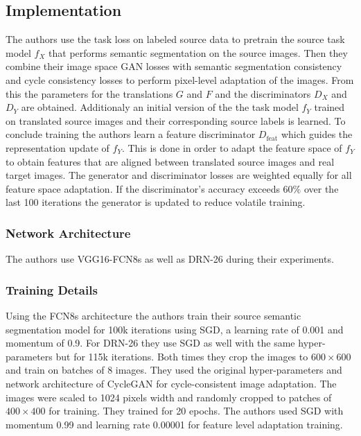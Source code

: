 \subsection{Implementation}
The authors use the task loss on labeled source data to pretrain the source task model $f_X$ that performs semantic segmentation on the source images. Then they combine their image space GAN losses with semantic segmentation consistency and cycle consistency losses to perform pixel-level adaptation of the images. From this the parameters for the translations $G$ and $F$ and the discriminators $D_X$ and $D_Y$ are obtained. Additionaly an initial version of the the task model $f_Y$ trained on translated source images and their corresponding source labels is learned. To conclude training the authors learn a feature discriminator $D_{\text{feat}}$ which guides the representation update of $f_Y$. This is done in order to adapt the feature space of $f_Y$ to obtain features that are aligned between translated source images and real target images. The generator and discriminator losses are weighted equally for all feature space adaptation. If the discriminator's accuracy exceeds $60\%$ over the last 100 iterations the generator is updated to reduce volatile training. 

\subsubsection{Network Architecture}
The authors use VGG16-FCN8s \cite{DBLP:journals/corr/LongSD14} as well as DRN-26 \cite{DBLP:journals/corr/YuKF17} during their experiments. 

\subsubsection{Training Details}
Using the FCN8s architecture the authors train their source semantic segmentation model for 100k iterations using SGD, a learning rate of 0.001 and momentum of 0.9. For DRN-26 they use SGD as well with the same hyper-parameters but for 115k iterations. Both times they crop the images to $600 \times 600$ and train on batches of 8 images. They used the original hyper-parameters and network architecture of CycleGAN \cite{DBLP:journals/corr/ZhuPIE17} for cycle-consistent image adaptation. The images were scaled to 1024 pixels width and randomly cropped to patches of $400 \times 400$ for training. They trained for 20 epochs. The authors used SGD with momentum 0.99 and learning rate 0.00001 for feature level adaptation training. %


